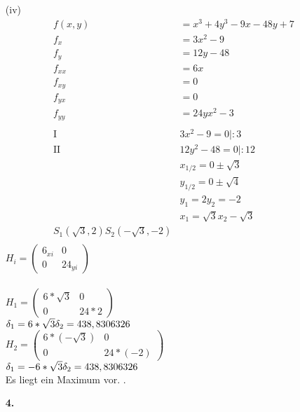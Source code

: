 \documentclass[a4paper,11pt,fleqn]{scrartcl}
\begin{document}
\begin{enumerate}
	\item[(iv)]
	 \begin{align*}
	 	f(x,y)&=x^3+4y^3-9x-48y+7\\
	 	f_{x}&=3x^2-9\\
	 	f_{y}&=12y-48\\
	 	f_{xx} &= 6x\\
		f_{xy} &= 0\\
		f_{yx} &=0\\
		f_{yy} &= 24y x^2-3\\\\
		\text{I }&3x^2-9=0  | :3\\
		\text{II }&12y^2-48=0 | :12\\
		&x_{1/2} = 0 \pm \sqrt{3}\\
		&y_{1/2}=0 \pm \sqrt{4}\\
		&y_{1} = 2 y_{2}=-2\\
		&x_{1}=\sqrt{3} x_{2}-\sqrt{3}\\
		S_{1}\left(\sqrt{3},2\right) S_{2}\left(-\sqrt{3},-2\right)\\
	 \end{align*}
	 $H_{i}=\left(\begin{matrix}
 		 6_{xi} & 0 \\
 		 0 & 24_{yi}
	 \end{matrix}\right)$\\\\
	 $H_{1}=\left(\begin{matrix}
 		 6*\sqrt{3} & 0 \\
 		 0 & 24*2
	 \end{matrix}\right)$\\
	 $ \delta_{1}=6*\sqrt{3}\\ \delta_{2}= 438,8306326$\\
	 $H_{2}=\left(\begin{matrix}
 		 6*(-\sqrt{3}) & 0 \\
 		 0 & 24*(-2)
	 \end{matrix}\right)$\\
	 $ \delta_{1}=-6*\sqrt{3}\\ \delta_{2}=438,8306326$\\
	Es liegt ein Maximum vor.
	.\\

\item[\textbf{4.}]

\end{enumerate}
\end{document}
